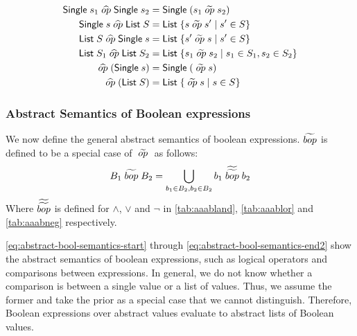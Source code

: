 \begin{align}
    \mathsf{Single} \; s_1 \aop \mathsf{Single} \; s_2 &= \mathsf{Single} \; (s_1 \aaop s_2) \label{eq:generalBOP} \\
    \mathsf{Single} \; s \aop \mathsf{List} \; S &= \mathsf{List} \; \{ s \aaop s' \mid s' \in S \} \\
    \mathsf{List} \; S \aop \mathsf{Single} \; s &= \mathsf{List} \; \{ s' \aaop s \mid s' \in S \}  \\
    \mathsf{List} \; S_1 \aop \mathsf{List} \; S_2 &= \mathsf{List} \; \{ s_1 \aaop s_2 \mid s_1 \in S_1, s_2 \in S_2 \} \\
    \aop (\mathsf{Single} \; s) &= \mathsf{Single} \; (\aaop s) \\
    \aop (\mathsf{List} \; S) &= \mathsf{List} \; \{ \aaop s \mid s \in S \} \label{eq:generalUOP}
\end{align}

\subsubsection{Abstract Semantics of Boolean expressions}
We now define the general abstract semantics of boolean expressions.
$\widetilde{bop}$ is defined to be a special case of $\;\widetilde{op}\;$ as follows:
\begin{align}
    B_1 \;\widetilde{bop}\; B_2 = \bigcup_{b_1 \in B_2, b_2 \in B_2} b_1 \;\widetilde{\widetilde{bop}}\; b_2
\end{align}
Where $\widetilde{\widetilde{bop}}$ is defined for $\land$, $\lor$ and $\neg$ in \autoref{tab:aaabland}, \autoref{tab:aaablor} and \autoref{tab:aaabneg} respectively.

\autoref{eq:abstract-bool-semantics-start} through \ref{eq:abstract-bool-semantics-end2} show the abstract semantics of boolean expressions, such as logical operators and comparisons between expressions.
In general, we do not know whether a comparison is between a single value or a list of values.
Thus, we assume the former and take the prior as a special case that we cannot distinguish.
Therefore, Boolean expressions over abstract values evaluate to abstract lists of Boolean values.

